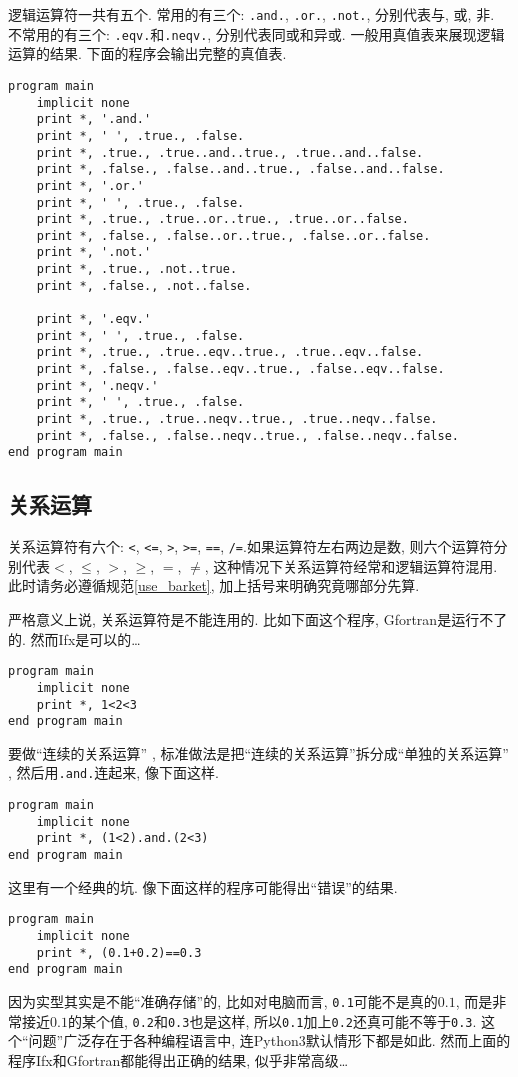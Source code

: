 逻辑运算符一共有五个. 常用的有三个: \texttt{.and.}, \texttt{.or.}, \texttt{.not.}, 分别代表与, 或, 非. 不常用的有三个: \texttt{.eqv.}和\texttt{.neqv.}, 分别代表同或和异或. 一般用真值表来展现逻辑运算的结果. 下面的程序会输出完整的真值表.
\begin{lstlisting}
program main
    implicit none
    print *, '.and.'
    print *, ' ', .true., .false.
    print *, .true., .true..and..true., .true..and..false.
    print *, .false., .false..and..true., .false..and..false.
    print *, '.or.'
    print *, ' ', .true., .false.
    print *, .true., .true..or..true., .true..or..false.
    print *, .false., .false..or..true., .false..or..false.
    print *, '.not.'
    print *, .true., .not..true.
    print *, .false., .not..false.
  
    print *, '.eqv.'
    print *, ' ', .true., .false.
    print *, .true., .true..eqv..true., .true..eqv..false.
    print *, .false., .false..eqv..true., .false..eqv..false.
    print *, '.neqv.'
    print *, ' ', .true., .false.
    print *, .true., .true..neqv..true., .true..neqv..false.
    print *, .false., .false..neqv..true., .false..neqv..false.
end program main
\end{lstlisting}

\subsection{关系运算}

关系运算符有六个: \texttt{<}, \texttt{<=}, \texttt{>}, \texttt{>=}, \texttt{==}, \texttt{/=}.如果运算符左右两边是数, 则六个运算符分别代表$<$, $\leqslant$, $>$, $\geqslant$, $=$, $\ne$, 这种情况下关系运算符经常和逻辑运算符混用. 此时请务必遵循规范\ref{use_barket}, 加上括号来明确究竟哪部分先算.

严格意义上说, 关系运算符是不能连用的. 比如下面这个程序, Gfortran是运行不了的. 然而Ifx是可以的\dots
\begin{lstlisting}
program main
    implicit none
    print *, 1<2<3
end program main
\end{lstlisting}

要做``连续的关系运算'' , 标准做法是把``连续的关系运算''拆分成``单独的关系运算'' , 然后用\texttt{.and.}连起来, 像下面这样.
\begin{lstlisting}
program main
    implicit none
    print *, (1<2).and.(2<3)
end program main
\end{lstlisting}

这里有一个经典的坑. 像下面这样的程序可能得出``错误''的结果.
\begin{lstlisting}
program main
    implicit none
    print *, (0.1+0.2)==0.3
end program main
\end{lstlisting}
因为实型其实是不能``准确存储''的, 比如对电脑而言, \texttt{0.1}可能不是真的$0.1$, 而是非常接近$0.1$的某个值, \texttt{0.2}和\texttt{0.3}也是这样, 所以\texttt{0.1}加上\texttt{0.2}还真可能不等于\texttt{0.3}. 这个``问题''广泛存在于各种编程语言中, 连Python3默认情形下都是如此. 然而上面的程序Ifx和Gfortran都能得出正确的结果, 似乎非常高级\dots

